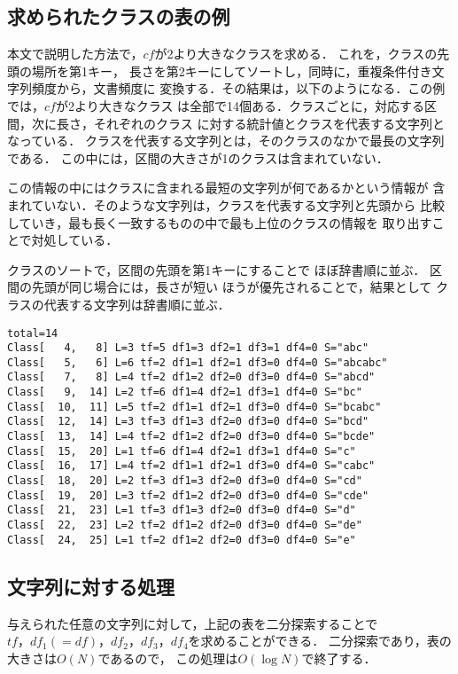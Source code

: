 \subsection{求められたクラスの表の例}

本文で説明した方法で，$cf$が2より大きなクラスを求める．
これを，クラスの先頭の場所を第1キー，
長さを第2キーにしてソートし，同時に，重複条件付き文字列頻度から，文書頻度に
変換する．その結果は，以下のようになる．この例では，$cf$が2より大きなクラス
は全部で14個ある．クラスごとに，対応する区間，次に長さ，それぞれのクラス
に対する統計値とクラスを代表する文字列となっている．
クラスを代表する文字列とは，そのクラスのなかで最長の文字列である．
この中には，区間の大きさが1のクラスは含まれていない．

この情報の中にはクラスに含まれる最短の文字列が何であるかという情報が
含まれていない．そのような文字列は，クラスを代表する文字列と先頭から
比較していき，最も長く一致するものの中で最も上位のクラスの情報を
取り出すことで対処している．

クラスのソートで，区間の先頭を第1キーにすることで
ほぼ辞書順に並ぶ．
区間の先頭が同じ場合には，長さが短い
ほうが優先されることで，結果として
クラスの代表する文字列は辞書順に並ぶ．

\begin{verbatim}
total=14
Class[   4,   8] L=3 tf=5 df1=3 df2=1 df3=1 df4=0 S="abc"
Class[   5,   6] L=6 tf=2 df1=1 df2=1 df3=0 df4=0 S="abcabc"
Class[   7,   8] L=4 tf=2 df1=2 df2=0 df3=0 df4=0 S="abcd"
Class[   9,  14] L=2 tf=6 df1=4 df2=1 df3=1 df4=0 S="bc"
Class[  10,  11] L=5 tf=2 df1=1 df2=1 df3=0 df4=0 S="bcabc"
Class[  12,  14] L=3 tf=3 df1=3 df2=0 df3=0 df4=0 S="bcd"
Class[  13,  14] L=4 tf=2 df1=2 df2=0 df3=0 df4=0 S="bcde"
Class[  15,  20] L=1 tf=6 df1=4 df2=1 df3=1 df4=0 S="c"
Class[  16,  17] L=4 tf=2 df1=1 df2=1 df3=0 df4=0 S="cabc"
Class[  18,  20] L=2 tf=3 df1=3 df2=0 df3=0 df4=0 S="cd"
Class[  19,  20] L=3 tf=2 df1=2 df2=0 df3=0 df4=0 S="cde"
Class[  21,  23] L=1 tf=3 df1=3 df2=0 df3=0 df4=0 S="d"
Class[  22,  23] L=2 tf=2 df1=2 df2=0 df3=0 df4=0 S="de"
Class[  24,  25] L=1 tf=2 df1=2 df2=0 df3=0 df4=0 S="e"
\end{verbatim}

\subsection{文字列に対する処理}

与えられた任意の文字列に対して，上記の表を二分探索することで
$tf， df_1(=df)， df_2， df_3， df_4$を求めることができる．
二分探索であり，表の大きさは$O(N)$であるので，
この処理は$O(\log N)$で終了する．

